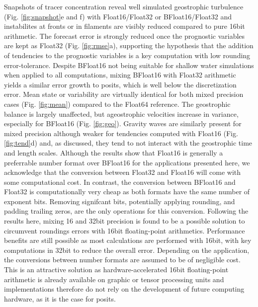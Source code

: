 \documentclass[draft]{agujournal2019}
\begin{document}
Snapshots of tracer concentration reveal well simulated geostrophic turbulence (Fig. \ref{fig:snapshot}e and f) with Float16/Float32 or BFloat16/Float32 and instabilites at fronts or in filaments are visibly reduced compared to pure 16bit arithmetic. The forecast error is strongly reduced once the prognostic variables are kept as Float32 (Fig. \ref{fig:rmse}a), supporting the hypothesis that the addition of tendencies to the prognostic variables is a key computation with low rounding error-tolerance. Despite BFloat16 not being suitable for shallow water simulations when applied to all computations, mixing BFloat16 with Float32 arithmetic yields a similar error growth to posits, which is well below the discretization error. Mean state or variability are virtually identical for both mixed precision cases (Fig. \ref{fig:mean}) compared to the Float64 reference. The geostrophic balance is largely unaffected, but ageostrophic velocities increase in variance, especially for BFloat16 (Fig. \ref{fig:geo}). Gravity waves are similarly present for mixed precision although weaker for tendencies computed with Float16 (Fig. \ref{fig:tend}d) and, as discussed, they tend to not interact with the geostrophic time and length scales. Although the results show that Float16 is generally a preferrable number format over BFloat16 for the applications presented here, we acknowledge that the conversion between Float32 and Float16 will come with some computational cost. In contrast, the conversion between BFloat16 and Float32 is computationally very cheap as both formats have the same number of exponent bits. Removing signifcant bits, potentially applying rounding, and padding trailing zeros, are the only operations for this conversion. Following the results here, mixing 16 and 32bit precision is found to be a possible solution to circumvent roundings errors with 16bit floating-point arithmetics. Performance benefits are still possible as most calculations are performed with 16bit, with key computations in 32bit to reduce the overall error. Depending on the application, the conversions between number formats are assumed to be of negligible cost. This is an attractive solution as hardware-accelerated 16bit floating-point arithmetic is already available on graphic or tensor processing units and implementations therefore do not rely on the development of future computing hardware, as it is the case for posits.
\end{document}
